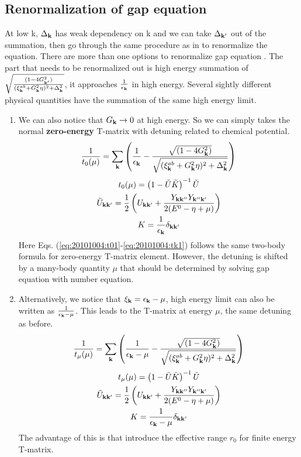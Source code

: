 \documentclass{article}
\renewcommand{\emph}[1]{\textbf{#1}}
\begin{document}
\subsection{Renormalization of gap equation}
At low k, $\Delta_{\mathbf{k}}$ has weak dependency on k and we can take $\Delta_{\mathbf{k}'}$ out of the summation,  then go through the same procedure as in \cite{Leggett,Fetter} to renormalize the equation. There are more than one options to renormalize gap equation .  The part that needs to be renormalized out is  high energy summation of $\sqrt{\frac{(1-4G_{\mathbf{k}'}^{2})}{{(\xi^{ab}_{\mathbf{k}}+  G_{\mathbf{k}}^2\eta)^{2}+\Delta_{\mathbf{k}}^{2}}}}$, it approaches $\frac{1}{\epsilon_{\mathbf{k}}}$ in high energy.  Several sightly different physical quantities have the summation of the same high energy limit.  
\begin{enumerate}

\item We can also notice that $G_{\mathbf{k}}\rightarrow0$ at high energy.  So we can simply takes the normal \emph{zero-energy} T-matrix with detuning related to chemical potential.  
\begin{equation}\label{eq:20101004:renormGap1}
\frac{1}{{t_{0}}(\mu)}=\sum_{\mathbf{k}}
\left(\frac{1}{\epsilon_{\mathbf{k}}}-\frac{\sqrt{(1-4G_{\mathbf{k}}^{2})}}{\sqrt{{(\xi^{ab}_{\mathbf{k}}+  G_{\mathbf{k}}^2\eta)^{2}+\Delta_{\mathbf{k}}^{2}}}}\right)
\end{equation} 
\begin{gather}
{t_{0}}(\mu)=\left(1-\tilde{U}\tilde{ K}\right)^{-1}\tilde{U}\label{eq:20101004:t01}\\
\tilde{U}_{\mathbf{k}\mathbf{k}'}=\frac{1}{2} \left(U_{\mathbf{k}\mathbf{k}'}+\frac{Y_{\mathbf{k}\mathbf{k}''}Y_{\mathbf{k}''\mathbf{k}'}}{2(E^{0}-\eta+\mu)}\right)\label{eq:20101004:tu1}\\
{K}=\frac{1}{\epsilon_{\mathbf{k}}}\delta_{\mathbf{k}\mathbf{k}'}\label{eq:20101004:tk1}
\end{gather}
Here Eqs. (\ref{eq:20101004:t01}-\ref{eq:20101004:tk1}) follows the same two-body formula for zero-energy T-matrix element.  However, the detuning is shifted by a many-body quantity $\mu$ that should be determined by solving gap equation with number equation.    
\item  Alternatively, we notice that $\xi_{\mathbf{k}}=\epsilon_{\mathbf{k}}-\mu$, high energy limit can also be written as 
$\frac{1}{\epsilon_{\mathbf{k}}-\mu}$.  This leads to the T-matrix at energy $\mu$, the same detuning as before.  
\begin{equation}\label{eq:20101004:renormGap2}
\frac{1}{{t_{\mu}}(\mu)}=\sum_{\mathbf{k}}
\left(\frac{1}{\epsilon_{\mathbf{k}}-\mu}-\frac{\sqrt{(1-4G_{\mathbf{k}}^{2})}}{\sqrt{{(\xi^{ab}_{\mathbf{k}}+  G_{\mathbf{k}}^2\eta)^{2}+\Delta_{\mathbf{k}}^{2}}}}\right)
\end{equation} 
\begin{gather}
{t_{\mu}}(\mu)=\left(1-\tilde{U}\tilde{ K}\right)^{-1}\tilde{U}\label{eq:20101004:t02}\\
\tilde{U}_{\mathbf{k}\mathbf{k}'}=\frac{1}{2} \left(U_{\mathbf{k}\mathbf{k}'}+\frac{Y_{\mathbf{k}\mathbf{k}''}Y_{\mathbf{k}''\mathbf{k}'}}{2(E^{0}-\eta+\mu)}\right)\label{eq:20101004:tu2}\\
{K}=\frac{1}{\epsilon_{\mathbf{k}}-\mu}\delta_{\mathbf{k}\mathbf{k}'}\label{eq:20101004:tk2}
\end{gather}
The advantage of this is that introduce the effective range $r_{0}$ for finite energy T-matrix. 
\end{enumerate}
\end{document}
